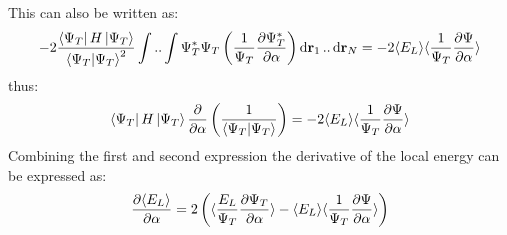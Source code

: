 \documentclass[a4paper, 10pt]{article}
\begin{document}
\begin{appendices}
This can also be written as:
\begin{align}
-2\frac{\bra{\Psi_{T}}H\ket{\Psi_{T}}}{\braket{\Psi_{T}}^{2}}\int..\int \Psi_{T}^{*}\Psi_{T}\left(\frac{1}{\Psi_{T}}\pdv{\Psi_{T}^{*}}{\alpha}\right)\dd{\bold{r}_{1}}..\dd{\bold{r}_{N}}
= -2\langle E_{L} \rangle \langle \frac{1}{\Psi_{T}}\pdv{\Psi}{\alpha}\rangle
\end{align}
thus:
\begin{align}
\bra{\Psi_{T}}H\ket{\Psi_{T}}\pdv{\alpha}\left(\frac{1}{\braket{\Psi_{T}}}\right)
= -2\langle E_{L} \rangle \langle \frac{1}{\Psi_{T}}\pdv{\Psi}{\alpha}\rangle
\end{align}
Combining the first and second expression the derivative of the local energy can
be expressed as:
\begin{align}
\pdv{\langle E_{L} \rangle }{\alpha} =
2\left(\langle \frac{E_{L}}{\Psi_{T}}\pdv{\Psi_{T}}{\alpha} \rangle -
\langle E_{L} \rangle \langle \frac{1}{\Psi_{T}}\pdv{\Psi}{\alpha}\rangle\right)
\end{align}
	\end{appendices}
\end{document}
